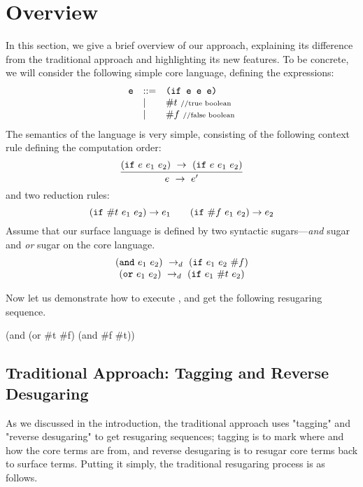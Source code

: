 \section{Overview}
\label{sec2}

In this section, we give a brief overview of our approach, explaining its difference from the traditional approach and highlighting its new features. To be concrete, we will consider the following simple core language, defining the  expressions:
\[
\begin{array}{lll}
\mbox{\tt e} &::=& \texttt{(if~e~e~e)}\\
& |& \#t~\mbox{{\scriptsize //true boolean}}\\
& |& \#f~\mbox{{\scriptsize //false boolean}}
\end{array}
\]
The semantics of the language is very simple, consisting of the following context rule defining the computation order:
\[
\centering
\infer
{e~\rightarrow~e'}
{(\m{if}~e~e_1~e_2)~\rightarrow~(\m{if}~e~e_1~e_2)}
\]
and two reduction rules:
\[
\centering
(\m{if}~\#t~e_1~e_2) \rightarrow e_1 \qquad (\m{if}~\#f~e_1~e_2) \rightarrow e_2
\]
Assume that our surface language is defined by two syntactic sugars---\emph{and} sugar and \emph{or} sugar on the core language.
\[
\begin{array}{c}
(\mbox{\tt and}~e_1~e_2) ~\rightarrow_d~ (\mbox{\tt if}~e_1~e_2~\#f)\\
(\mbox{\tt or}~e_1~e_2) ~\rightarrow_d~ (\mbox{\tt if}~e_1~\#t~e_2)
\end{array}
\]


Now let us demonstrate how to execute , and get the following resugaring sequence.
\begin{Codes}
    (and (or \#t \#f) (and \#f \#t))
\end{Codes}



\subsection{Traditional Approach: Tagging and Reverse Desugaring}

As we discussed in the introduction, the traditional approach uses "tagging" and "reverse desugaring" to get resugaring sequences; tagging is to mark where and how the core terms are from, and reverse desugaring is to resugar core terms back to surface terms. Putting it simply, the traditional resugaring process is as follows.

